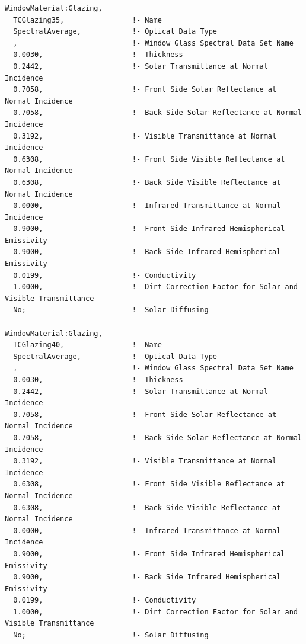 \begin{lstlisting}
WindowMaterial:Glazing,
  TCGlazing35,                !- Name
  SpectralAverage,            !- Optical Data Type
  ,                           !- Window Glass Spectral Data Set Name
  0.0030,                     !- Thickness
  0.2442,                     !- Solar Transmittance at Normal Incidence
  0.7058,                     !- Front Side Solar Reflectance at Normal Incidence
  0.7058,                     !- Back Side Solar Reflectance at Normal Incidence
  0.3192,                     !- Visible Transmittance at Normal Incidence
  0.6308,                     !- Front Side Visible Reflectance at Normal Incidence
  0.6308,                     !- Back Side Visible Reflectance at Normal Incidence
  0.0000,                     !- Infrared Transmittance at Normal Incidence
  0.9000,                     !- Front Side Infrared Hemispherical Emissivity
  0.9000,                     !- Back Side Infrared Hemispherical Emissivity
  0.0199,                     !- Conductivity
  1.0000,                     !- Dirt Correction Factor for Solar and Visible Transmittance
  No;                         !- Solar Diffusing

WindowMaterial:Glazing,
  TCGlazing40,                !- Name
  SpectralAverage,            !- Optical Data Type
  ,                           !- Window Glass Spectral Data Set Name
  0.0030,                     !- Thickness
  0.2442,                     !- Solar Transmittance at Normal Incidence
  0.7058,                     !- Front Side Solar Reflectance at Normal Incidence
  0.7058,                     !- Back Side Solar Reflectance at Normal Incidence
  0.3192,                     !- Visible Transmittance at Normal Incidence
  0.6308,                     !- Front Side Visible Reflectance at Normal Incidence
  0.6308,                     !- Back Side Visible Reflectance at Normal Incidence
  0.0000,                     !- Infrared Transmittance at Normal Incidence
  0.9000,                     !- Front Side Infrared Hemispherical Emissivity
  0.9000,                     !- Back Side Infrared Hemispherical Emissivity
  0.0199,                     !- Conductivity
  1.0000,                     !- Dirt Correction Factor for Solar and Visible Transmittance
  No;                         !- Solar Diffusing


\end{lstlisting}
